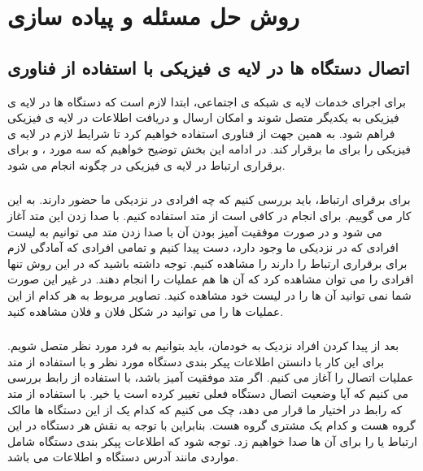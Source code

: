 \chapter{روش حل مسئله و پیاده سازی}
\thispagestyle{empty}
\section{اتصال دستگاه ها  در لایه ی فیزیکی با استفاده از فناوری }

برای اجرای خدمات لایه ی شبکه ی اجتماعی، ابتدا لازم است که دستگاه ها در لایه ی فیزیکی به یکدیگر متصل شوند و امکان ارسال و دریافت اطلاعات در لایه ی فیزیکی فراهم شود. به همین جهت از فناوری 
استفاده خواهیم کرد تا شرایط لازم در لایه ی فیزیکی را برای ما برقرار کند. در ادامه این بخش توضیح خواهیم که سه مورد 
،
و
برای برقراری ارتباط در لایه ی فیزیکی در 
چگونه انجام می شود.
\subsection{}
 برای برقرای ارتباط، باید بررسی کنیم که چه افرادی در نزدیکی ما حضور دارند. به این کار
  می گوییم. برای انجام 
در 
کافی است از متد
استفاده کنیم. با صدا زدن این متد
آغاز می شود و در صورت موفقیت آمیز بودن آن با صدا زدن متد
می توانیم به لیست افرادی که در نزدیکی ما وجود دارد، دست پیدا کنیم و تمامی افرادی که آمادگی لازم برای برقراری ارتباط را دارند را مشاهده کنیم. توجه داشته باشید که در این روش تنها افرادی را می توان مشاهده کرد که آن ها هم عملیات 
را انجام دهند. در غیر این صورت شما نمی توانید آن ها را در لیست خود مشاهده کنید. تصاویر مربوط به هر کدام از این عملیات ها را می توانید در شکل فلان و فلان مشاهده کنید.
\subsection{}
بعد از پیدا کردن افراد نزدیک به خودمان، باید بتوانیم به فرد مورد نظر متصل شویم. برای این کار با دانستن اطلاعات پیکر بندی دستگاه مورد نظر و با استفاده از متد 
عملیات اتصال را آغاز می کنیم. اگر متد 
موفقیت آمیز باشد، با استفاده از رابط 
بررسی می کنیم که آیا وضعیت اتصال دستگاه فعلی تغییر کرده است یا خیر. با استفاده از متد 
که رابط 
 در اختیار ما قرار می دهد، چک می کنیم که کدام یک از این دستگاه ها مالک گروه هست و کدام یک مشتری گروه هست. بنابراین با توجه به نقش هر دستگاه در این ارتباط 
یا 
را برای آن ها صدا خواهیم زد.
توجه شود که اطلاعات پیکر بندی دستگاه شامل مواردی مانند آدرس 
دستگاه و اطلاعات 
می باشد.

